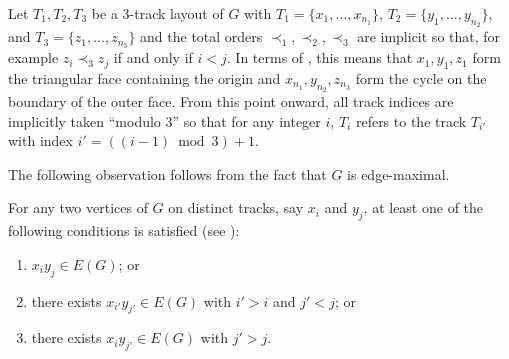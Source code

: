 \documentclass{patmorin}
\begin{document}
Let $T_1,T_2,T_3$ be a 3-track layout of $G$ with
$T_1=\{x_1,\ldots,x_{n_1}\}$, $T_2=\{y_1,\ldots,y_{n_2}\}$, and
$T_3=\{z_1,\ldots,z_{n_3}\}$ and the total orders $\prec_1,\prec_2,\prec_3$
are implicit so that, for example $z_i\prec_3 z_j$ if and only if $i<j$.
In terms of , this means that $x_1,y_1,z_1$ form
the triangular face containing the origin and $x_{n_1},y_{n_2},z_{n_3}$
form the cycle on the boundary of the outer face.
From this point onward, all track indices are implicitly taken ``modulo 3''
so that for any integer $i$, $T_i$ refers to the track $T_{i'}$ with
index $i'=((i-1)\bmod 3)+1$.  

The following observation follows from the fact that $G$ is edge-maximal.
\begin{obs}
  For any two vertices of $G$ on distinct tracks, say $x_i$ and $y_j$, at least
  one of the following conditions is satisfied (see ):
  \begin{enumerate}
    \item $x_{i}y_{j}\in E(G)$; or
    \item there exists $x_{i'}y_{j'} \in E(G)$ with $i'>i$ and $j'<j$; or
    \item there exists $x_{i}y_{j'}\in E(G)$ with $j'>j$.
  \end{enumerate}
\end{obs}
\end{document}
